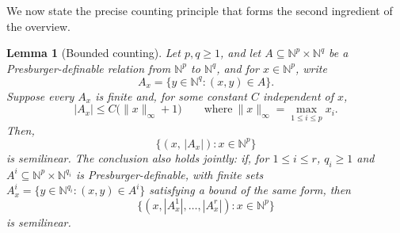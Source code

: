 \documentclass[11pt]{article}
\newtheorem{lemma}[theorem]{Lemma}
\theoremstyle{definition}
\newcommand{\N}{\mathbb N}
\begin{document}
We now state the precise counting principle that forms the second ingredient
of the overview.

\begin{lemma}[Bounded counting]\label{lem:presburger-counting}
Let $p,q\ge 1$, and let $A\subseteq\N^p\times\N^q$ be a Presburger-definable relation
from $\N^p$ to $\N^q$, and for $x\in\N^p$, write
\[
   A_x=\{y\in\N^q:(x,y)\in A\}.
\]
Suppose every $A_x$ is finite and, for some constant
$C$ independent of $x$,
\[
   |A_x|\le C\bigl(\|x\|_\infty+1\bigr)
   \qquad\text{where}\
   \|x\|_\infty=\max_{1\le i\le p}x_i.
\]
Then,
\[
\{(x,\,|A_x|):x\in\N^p\}
\]
is semilinear.  The conclusion also holds jointly: if, for $1\le i\le r$,
$q_i\ge1$ and $A^i\subseteq\N^p\times\N^{q_i}$ is Presburger-definable, with
finite sets $A^i_x=\{y\in\N^{q_i}:(x,y)\in A^i\}$ satisfying a bound of the
same form, then
\[
   \{(x,|A^1_x|,\ldots,|A^r_x|):x\in\N^p\}
\]
is semilinear.
\end{lemma}
\end{document}
